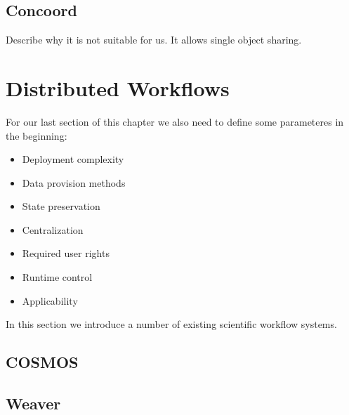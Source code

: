 \subsection{Concoord}
Describe why it is not suitable for us. It allows single object sharing.

\section{Distributed Workflows}
For our last section of this chapter we also need to define some parameteres in the beginning:
\begin{itemize}
\item Deployment complexity
\item Data provision methods
\item State preservation
\item Centralization
\item Required user rights
\item Runtime control
\item Applicability
\end{itemize}

In this section we introduce a number of existing scientific workflow systems.
\subsection{COSMOS}\cite{Gafni30062014}
\subsection{Weaver}\cite{Bui_weaver:integrating}